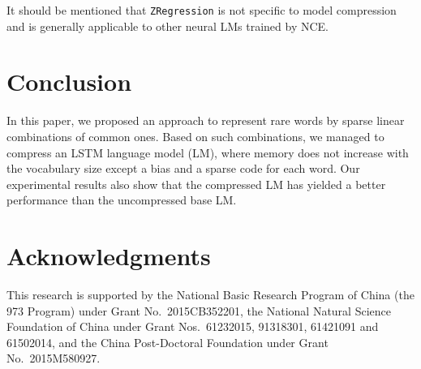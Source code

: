 \documentclass[11pt]{article}
\begin{document}
It should be mentioned that \texttt{ZRegression} is not specific to model compression and is generally applicable to other neural LMs trained by NCE.

\section{Conclusion}
In this paper, we proposed an approach to represent rare words by sparse linear combinations of common ones. Based on such combinations, we managed to compress an LSTM language model (LM), where memory does not increase with the vocabulary size  except a bias and a sparse code for each word. Our experimental results also show that the compressed LM has yielded a better performance than the uncompressed base LM.

\section*{Acknowledgments}
This research is supported by the National Basic Research Program of China (the 973 Program) under Grant No.~2015CB352201, the National Natural Science Foundation of China under Grant Nos.~61232015, 91318301, 61421091 and 61502014, and the China Post-Doctoral Foundation under Grant No.~2015M580927.



\end{document}
